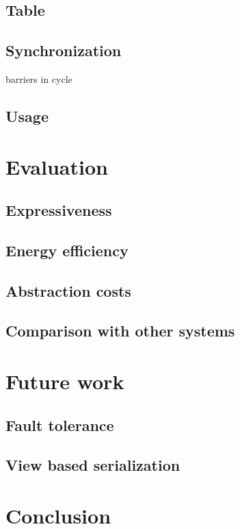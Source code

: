 \documentclass{uit-report}
\begin{document}
\subsection{Table}
\subsection{Synchronization}
barriers in cycle
\subsection{Usage}

\newpage
\section{Evaluation}
\subsection{Expressiveness}
\subsection{Energy efficiency}
\subsection{Abstraction costs}
\subsection{Comparison with other systems}

\newpage
\section{Future work}
\subsection{Fault tolerance}
\subsection{View based serialization}

\newpage
\section{Conclusion}



\pagebreak



\end{document}
